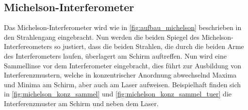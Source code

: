 \documentclass[ngerman]{scrartcl}
\begin{document}
\subsection{Michelson-Interferometer}
\label{sec:durchfuehrung_michelson}

Das Michelson-Interferometer wird wie in \autoref{fig:aufbau_michelson} beschrieben in den Strahlengang eingebracht. Nun werden die beiden Spiegel des Michelson-Interfereometers so justiert, dass die beiden Strahlen, die durch die beiden Arme des Interferometers laufen, überlagert am Schirm auftreffen. Nun wird eine Sammellinse vor dem Interferometer eingebracht, dies führt zur Ausbildung von Interferenzmustern, welche in konzentrischer Anordnung abwechselnd Maxima und Minima am Schirm, aber auch am Laser aufweisen. Beispielhaft finden sich in \autoref{fig:michelson_konz_sammel} und \autoref{fig:michelson_konz_sammel_tuer} die Interferenzmuster am Schirm und neben dem Laser.
\end{document}
